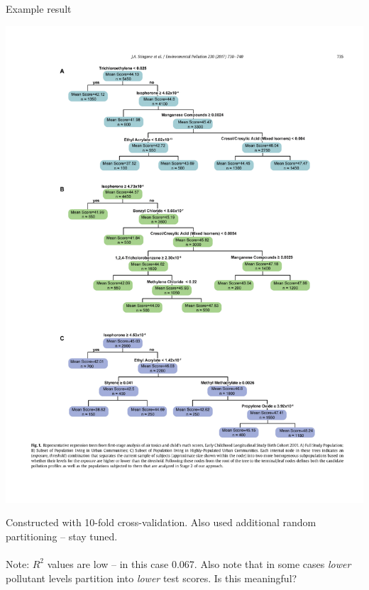 \documentclass[mathserif, aspectratio=169]{beamer}
\begin{document}
\begin{frame}{Example result}

\includegraphics[width=\textwidth]{stingone_tree_totalpop}

Constructed with 10-fold cross-validation.  Also used additional random partitioning -- stay tuned.\\~\\

Note: $R^2$ values are low -- in this case 0.067.  Also note that in some cases \textit{lower} pollutant levels partition into \textit{lower} test scores.  Is this meaningful?
\end{frame}
\end{document}
